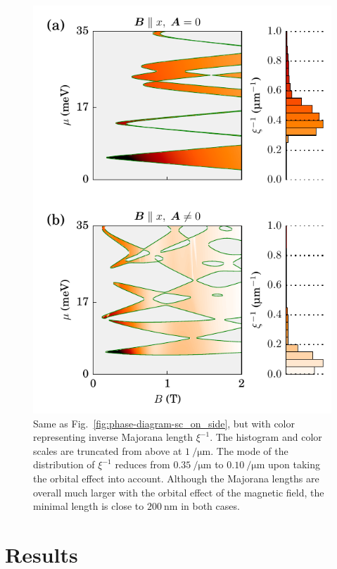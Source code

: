 \begin{figure}
\includegraphics[width=0.95\columnwidth]{chapter_orbitalfield/figures/sc_on_side_length}
\caption{Same as Fig.~\ref{fig:phase-diagram-sc_on_side}, but with color representing inverse Majorana length $\xi^{-1}$.
The histogram and color scales are truncated from above at $\SI{1}{\per\micro\metre}$.
The mode of the distribution of $\xi^{-1}$ reduces from $\SI{0.35}{\per\micro\metre}$ to $\SI{0.10}{\per\micro\metre}$ upon taking the orbital effect into account.
Although the Majorana lengths are overall much larger with the orbital effect of the magnetic field, the minimal length is close to $\SI{200}{\nano\metre}$ in both cases.\label{fig:Majorana-length}}
\end{figure}

\section{Results}


